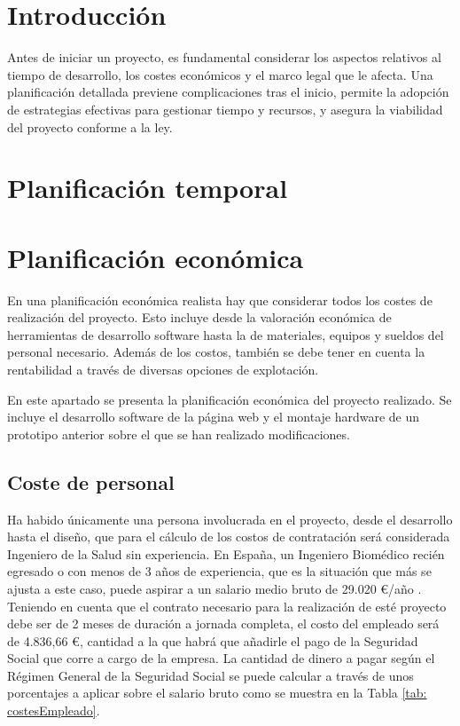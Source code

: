 
\section{Introducción}
Antes de iniciar un proyecto, es fundamental considerar los aspectos relativos al tiempo de desarrollo, los costes económicos y el marco legal que le afecta. Una planificación detallada previene complicaciones tras el inicio, permite la adopción de estrategias efectivas para gestionar tiempo y recursos, y asegura la viabilidad del proyecto conforme a la ley.

\section{Planificación temporal}


\section{Planificación económica}
En una planificación económica realista hay que considerar todos los costes de realización del proyecto. Esto incluye desde la valoración económica de herramientas de desarrollo software hasta la de materiales, equipos y sueldos del personal necesario.
Además de los costos, también se debe tener en cuenta la rentabilidad a través de diversas opciones de explotación.

En este apartado se presenta la planificación económica del proyecto realizado. Se incluye el desarrollo software de la página web y el montaje hardware de un prototipo anterior sobre el que se han realizado modificaciones.

\subsection{Coste de personal}
Ha habido únicamente una persona involucrada en el proyecto, desde el desarrollo hasta el diseño, que para el cálculo de los costos de contratación será considerada Ingeniero de la Salud sin experiencia. 
En España, un Ingeniero Biomédico recién egresado o con menos de 3 años de experiencia, que es la situación que más se ajusta a este caso, puede aspirar a un salario medio bruto de 29.020 €/año \cite{jobtedIngenieroBiomedico}. Teniendo en cuenta que el contrato necesario para la realización de esté proyecto debe ser de 2 meses de duración a jornada completa, el costo del empleado será de 4.836,66 €, cantidad a la que habrá que añadirle el pago de la Seguridad Social que corre a cargo de la empresa. La cantidad de dinero a pagar según el Régimen General de la Seguridad Social \cite{SeguridaSocial:online} se puede calcular a través de unos porcentajes a aplicar sobre el salario bruto como se muestra en la Tabla \ref{tab: costesEmpleado}.

